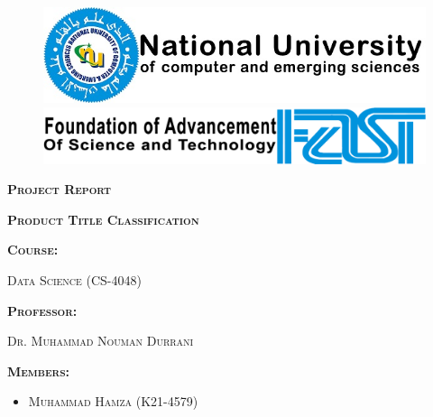 \documentclass[10pt]{article}
\begin{document}
\begin{titlepage}
    \begin{figure}[h]
        \begin{minipage}[c]{0.49\textwidth}
            \includegraphics[width=\linewidth]{NU-logo.jpg}
        \end{minipage}
        \hfill
        \begin{minipage}[c]{0.49\textwidth}
            \includegraphics[width=\linewidth]{FAST.png}
        \end{minipage}
    \end{figure}
    \vspace{2cm}
    \centering
    {\scshape\LARGE\textbf{Project Report} \par}
    \vspace{0.5cm}
    {\scshape\Huge\textbf{Product Title Classification} \par}
    \vspace{2cm}
    \raggedright
    {\scshape\LARGE\textbf{Course:}\\ \par}
    \vspace{0.5cm}
    {\scshape\Large Data Science (CS-4048) \par}
    \vspace{1cm}
    {\scshape\LARGE\textbf{Professor:}\\ \par}
    \vspace{0.5cm}
    {\scshape\Large Dr. Muhammad Nouman Durrani \par}
    \vspace{1cm}
    {\scshape\LARGE\textbf{Members:}\\ \par}
    \vspace{0.5cm}
    \begin{itemize}
        \item {\scshape\Large Muhammad Hamza (K21-4579)}

\end{itemize}
\end{titlepage}
\end{document}
